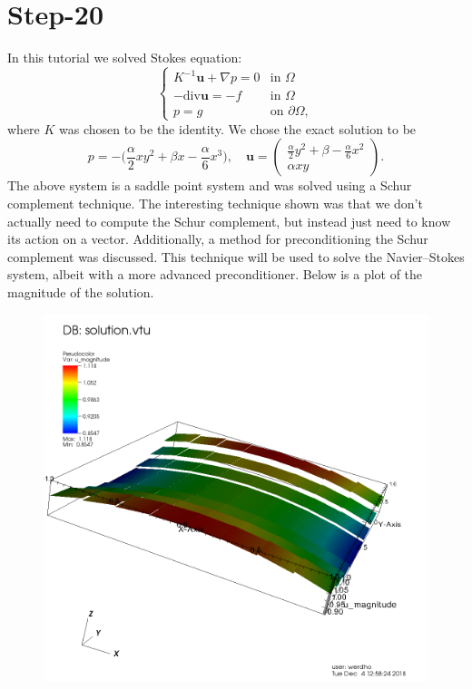 \documentclass[11pt,fullpage]{article}
\newcommand{\grad}{\nabla}
\theoremstyle{lemma}
\theoremstyle{definition}
\theoremstyle{lemma}
\begin{document}
\section*{Step-20}
In this tutorial we solved Stokes equation:
$$
\begin{cases}
K^{-1}\mathbf{u} + \grad p = 0 &\text{in }\Omega\\
-\text{div}\mathbf{u} = -f & \text{in }\Omega\\
p = g & \text{on }\partial \Omega,
\end{cases}
$$
where $K$ was chosen to be the identity. We chose the exact solution to be
$$
p = -\bigg(\frac{\alpha}{2}xy^2 + \beta x - \frac{\alpha}{6}x^3\bigg), \quad \mathbf{u} = \begin{pmatrix}
\frac{\alpha}{2}y^2 + \beta - \frac{\alpha}{6}x^2\\
\alpha xy
\end{pmatrix}.
$$
The above system is a saddle point system and was solved using a Schur complement technique. The interesting technique shown was that we don't actually need to compute the Schur complement, but instead just need to know its action on a vector. Additionally, a method for preconditioning the Schur complement was discussed. This technique will be used to solve the Navier--Stokes system, albeit with a more advanced preconditioner. Below is a plot of the magnitude of the solution.

\begin{figure}
	\centering
	\includegraphics[scale=.25]{Step20.png}
\end{figure}
\end{document}
